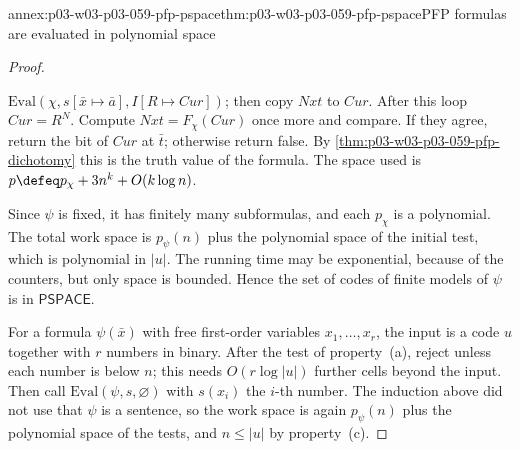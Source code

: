 \begin{annexitem}{annex:p03-w03-p03-059-pfp-pspace}{thm:p03-w03-p03-059-pfp-pspace}{PFP formulas are evaluated in polynomial space}
\begin{proof}
\begin{itemize}
       \(\mathrm{Eval}(\chi,s[\bar x\mapsto\bar a],I[R\mapsto\mathit{Cur}])\);
       then copy \(\mathit{Nxt}\) to \(\mathit{Cur}\). After this loop
       \(\mathit{Cur}=R^N\). Compute \(\mathit{Nxt}=F_\chi(\mathit{Cur})\)
       once more and compare. If they agree, return the bit of
       \(\mathit{Cur}\) at \(\bar t\); otherwise return false. By
       \cref{thm:p03-w03-p03-059-pfp-dichotomy} this is the truth value of
       the formula. The space used is
       \(p\defeq p_\chi+3n^k+O(k\log n)\).
\end{itemize}
Since \(\psi\) is fixed, it has finitely many subformulas, and each
\(p_\chi\) is a polynomial. The total work space is \(p_\psi(n)\) plus the
polynomial space of the initial test, which is polynomial in \(|u|\). The
running time may be exponential, because of the counters, but only space is
bounded. Hence the set of codes of finite models of \(\psi\) is in
\(\mathsf{PSPACE}\).

For a formula \(\psi(\bar x)\) with free first-order variables
\(x_1,\ldots,x_r\), the input is a code \(u\) together with \(r\) numbers in
binary. After the test of property~(a), reject unless each number is below
\(n\); this needs \(O(r\log|u|)\) further cells beyond the input. Then call
\(\mathrm{Eval}(\psi,s,\varnothing)\) with \(s(x_i)\) the \(i\)-th number.
The induction above did not use that \(\psi\) is a sentence, so the work
space is again \(p_\psi(n)\) plus the polynomial space of the tests, and
\(n\leq|u|\) by property~(c).
\end{proof}
\end{annexitem}

